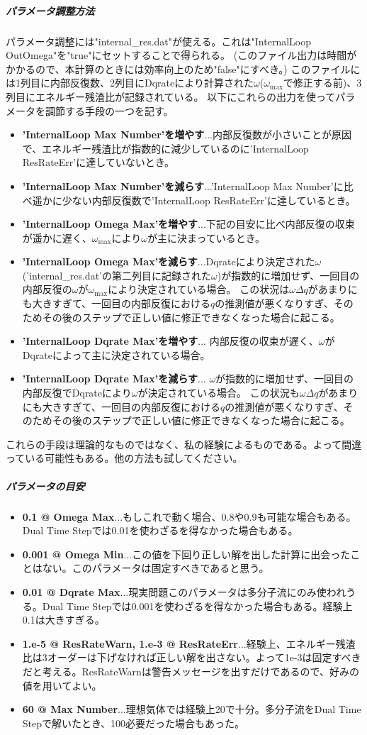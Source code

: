 \documentclass{jsarticle}
\begin{document}
\subparagraph{パラメータ調整方法}
パラメータ調整には"internal\_res.dat"が使える。これは"InternalLoop OutOmega"を"true"にセットすることで得られる。
(このファイル出力は時間がかかるので、本計算のときには効率向上のため"false"にすべき。)
このファイルには1列目に内部反復数、2列目にDqrateにより計算された$\omega$($\omega_{\max}$で修正する前)、3列目にエネルギー残渣比が記録されている。
以下にこれらの出力を使ってパラメータを調節する手段の一つを記す。
\begin{itemize}
\item \textbf{'InternalLoop Max Number'を増やす}...内部反復数が小さいことが原因で、エネルギー残渣比が指数的に減少しているのに'InternalLoop ResRateErr'に達していないとき。
\item \textbf{'InternalLoop Max Number'を減らす}...'InternalLoop Max Number'に比べ遥かに少ない内部反復数で'InternalLoop ResRateErr'に達しているとき。
\item \textbf{'InternalLoop Omega Max'を増やす}...下記の目安に比べ内部反復の収束が遥かに遅く、$\omega_{\max}$により$\omega$が主に決まっているとき。
\item \textbf{'InternalLoop Omega Max'を減らす}...Dqrateにより決定された$\omega$('internal\_res.dat'の第二列目に記録された$\omega$)が指数的に増加せず、一回目の内部反復の$\omega$が$\omega _{\max}$により決定されている場合。
この状況は$\omega\Delta q$があまりにも大きすぎて、一回目の内部反復における$q$の推測値が悪くなりすぎ、そのためその後のステップで正しい値に修正できなくなった場合に起こる。
\item \textbf{'InternalLoop Dqrate Max'を増やす}...
内部反復の収束が遅く、$\omega$がDqrateによって主に決定されている場合。
\item \textbf{'InternalLoop Dqrate Max'を減らす}...
$\omega$が指数的に増加せず、一回目の内部反復でDqrateにより$\omega$が決定されている場合。
この状況も$\omega\Delta q$があまりにも大きすぎて、一回目の内部反復における$q$の推測値が悪くなりすぎ、そのためその後のステップで正しい値に修正できなくなった場合に起こる。
\end{itemize}
これらの手段は理論的なものではなく、私の経験によるものである。よって間違っている可能性もある。他の方法も試してください。

\subparagraph{パラメータの目安}
\begin{itemize}
\item \textbf{0.1 @ Omega Max}...もしこれで動く場合、0.8や0.9も可能な場合もある。Dual Time Stepでは0.01を使わざるを得なかった場合もある。
\item \textbf{0.001 @ Omega Min}...この値を下回り正しい解を出した計算に出会ったことはない。このパラメータは固定すべきであると思う。
\item \textbf{0.01 @ Dqrate Max}...現実問題このパラメータは多分子流にのみ使われうる。Dual Time Stepでは0.001を使わざるを得なかった場合もある。経験上0.1は大きすぎる。
\item \textbf{1.e-5 @ ResRateWarn, 1.e-3 @ ResRateErr}...経験上、エネルギー残渣比は3オーダーは下げなければ正しい解を出さない。よって1e-3は固定すべきだと考える。ResRateWarnは警告メッセージを出すだけであるので、好みの値を用いてよい。
\item \textbf{60 @ Max Number}...理想気体では経験上20で十分。多分子流をDual Time Stepで解いたとき、100必要だった場合もあった。
\end{itemize}
\end{document}
